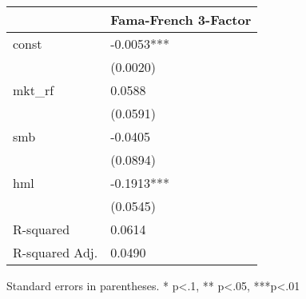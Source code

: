 \begin{table}
\caption{}
\label{}
\begin{center}
\begin{tabular}{ll}
\hline
               & Fama-French 3-Factor  \\
\hline
const          & -0.0053***            \\
               & (0.0020)              \\
mkt\_rf        & 0.0588                \\
               & (0.0591)              \\
smb            & -0.0405               \\
               & (0.0894)              \\
hml            & -0.1913***            \\
               & (0.0545)              \\
R-squared      & 0.0614                \\
R-squared Adj. & 0.0490                \\
\hline
\end{tabular}
\end{center}
\end{table}
\bigskip
Standard errors in parentheses. \newline 
* p<.1, ** p<.05, ***p<.01